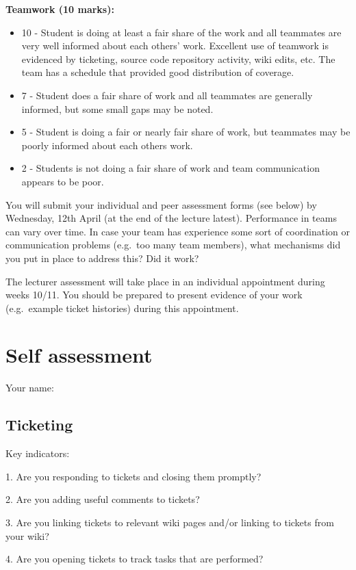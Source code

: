\documentclass{article}   	%
\begin{document}
\textbf{Teamwork (10 marks):}
\begin{itemize}
  \item 10 - Student is doing at least a fair share of the work and all teammates are very well informed about each others' work.  Excellent use of teamwork is evidenced by ticketing, source code repository activity, wiki edits, etc.  The team has a schedule that provided good distribution of coverage.
  \item 7 -  Student does a fair share of work and all teammates are generally informed, but some small gaps may be noted.
  \item 5 -  Student is doing a fair or nearly fair share of work, but teammates may be poorly informed about each others work.
  \item 2 -  Students is not doing a fair share of work and team communication appears to be poor.
\end{itemize}

You will submit your individual and peer assessment forms (see below) by %
Wednesday, 12th April (at the end of the lecture latest). Performance in teams can vary over time. In case your team has experience some sort of coordination or communication problems (e.g.~too many team members), what mechanisms did you put in place to address this? Did it work?

The lecturer assessment will take place in an individual appointment during weeks 10/11.  You should be prepared to present evidence of your work (e.g.~example ticket histories) during this appointment.

\newpage

\section*{Self assessment}

Your name: 
\vskip 1cm

\subsection*{Ticketing}

Key indicators: 

1.  Are you responding to tickets and closing them promptly?

2.  Are you adding useful comments to tickets?

3.  Are you linking tickets to relevant wiki pages and/or linking to tickets from your wiki?

4.  Are you opening tickets to track tasks that are performed?
\end{document}
